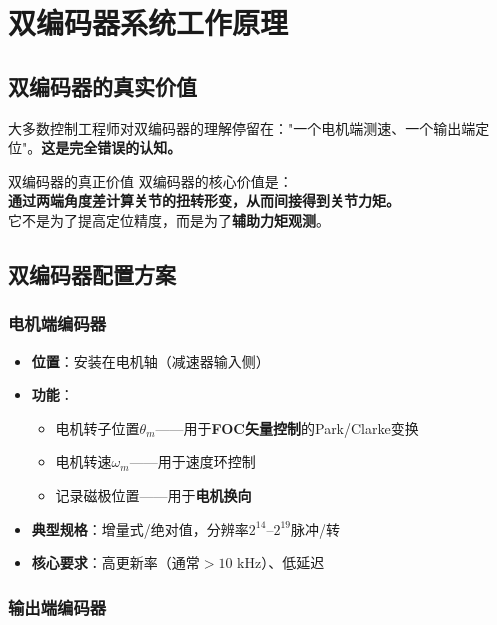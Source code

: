 \chapter{双编码器系统工作原理}
\label{ch:dual_encoder}

\section{双编码器的真实价值}

大多数控制工程师对双编码器的理解停留在："一个电机端测速、一个输出端定位"。\textbf{这是完全错误的认知。}

\begin{keyinsight}{双编码器的真正价值}
双编码器的核心价值是：\\
\textbf{通过两端角度差计算关节的扭转形变，从而间接得到关节力矩。}\\
它不是为了提高定位精度，而是为了\textbf{辅助力矩观测}。
\end{keyinsight}

\section{双编码器配置方案}

\subsection{电机端编码器}

\begin{itemize}
  \item \textbf{位置}：安装在电机轴（减速器输入侧）
  \item \textbf{功能}：
  \begin{itemize}
    \item 电机转子位置$\theta_m$——用于\textbf{FOC矢量控制}的Park/Clarke变换
    \item 电机转速$\omega_m$——用于速度环控制
    \item 记录磁极位置——用于\textbf{电机换向}
  \end{itemize}
  \item \textbf{典型规格}：增量式/绝对值，分辨率$2^{14}$--$2^{19}$脉冲/转
  \item \textbf{核心要求}：高更新率（通常$>10$ kHz）、低延迟
\end{itemize}

\subsection{输出端编码器}

